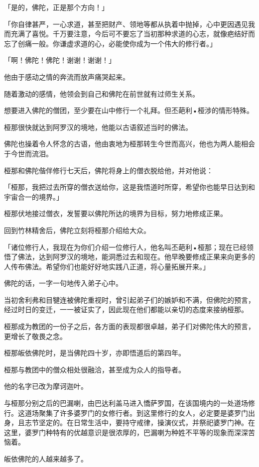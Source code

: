 \documentclass[twoside,openany]{book}
\begin{document}
「是的，佛陀，正是那个方向！」

「你自律甚严，一心求道，甚至把财产、领地等都从执着中抛掉，心中更因遇见我而充满了喜悦。千万要注意，今后可不要忘了当初那种求道的心志，就像疤结好而忘了创痛一般。你谦虚求道的心，必能使你成为一个伟大的修行者。」

「啊！佛陀！佛陀！谢谢！谢谢！」

他由于感动之情的奔流而放声痛哭起来。

随着激动的感情，他领会到自己和佛陀在前世就有过师生关系。

想要进入佛陀的僧团，至少要在山中修行一个礼拜。但丕葩利•桠涉的情形特殊。

桠那很快就达到阿罗汉的境地，他能以古语叙述当时的佛法。

佛陀也操着令人怀念的古语，他由衷地为桠那转生今世而高兴，他也为两人能相会于今世而流泪。

桠那和佛陀偕伴修行七天后，佛陀将身上的僧衣脱给他，并对他说：

「桠那，我把过去所穿的僧衣送给你，这是我悟道时所穿，希望你也能早日达到和宇宙合一的境界。」

桠那伏地接过僧衣，发誓要以佛陀所达的境界为目标，努力地修成正果。

回到竹林精舍后，佛陀立刻将桠那介绍给大众。

「诸位修行人，我现在为你们介绍一位修行人，他名叫丕葩利•桠那；现在已经领悟了佛法，达到阿罗汉的境地，能洞悉过去和现在。他早晚要修成正果来向更多的人传布佛法。希望你们也能好好地实践八正道，将心量拓展开来。」

佛陀的话，一字一句地传入弟子心中。

当初舍利弗和目犍连被佛陀重视时，曾引起弟子们的嫉妒和不满，但佛陀的预言，经过时日的变迁，一一被证实了，因此现在他们都能以亲切的态度来接纳桠那。

桠那成为教团的一份子之后，各方面的表现都很卓越，弟子们对佛陀伟大的预言，更增长了敬畏之念。

桠那皈依佛陀时，是当佛陀四十岁，亦即悟道后的第四年。

桠那与教团中的僧众相处很融洽，甚至成为众人的指导者。

他的名字已改为摩诃迦叶。

与桠那分别之后的巴漏喇，由巴达利盖马进入憍萨罗国，在该国境内的一处道场修行。这道场聚集了许多婆罗门的女修行者。到这里修行的女人，必定要是婆罗门出身，且志节坚定的。在日常生活中，要持守戒律，操演仪式，并祭祀婆罗门神。在这里，婆罗门种特有的优越意识是很浓厚的，巴漏喇为种姓不平等的现象而深深苦恼着。

皈依佛陀的人越来越多了。
\end{document}
